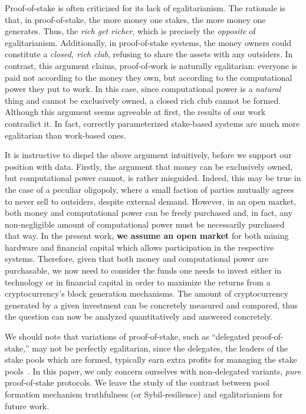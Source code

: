 
Proof-of-stake is often criticized for its lack of egalitarianism. The
rationale is that, in proof-of-stake, the more money one stakes, the more money
one generates. Thus, the \emph{rich get richer}, which is precisely the
\emph{opposite} of egalitarianism. Additionally, in proof-of-stake systems, the
money owners could constitute a \emph{closed, rich club}, refusing to share the
assets with any outsiders.  In contrast, this argument claims, proof-of-work is
naturally egalitarian: everyone is paid not according to the money they own,
but according to the computational power they put to work. In this case, since
computational power is a \emph{natural} thing and cannot be exclusively owned,
a closed rich club cannot be formed.
Although this argument seems agreeable at first, the results of our work contradict it.
In fact, correctly parameterized stake-based systems are much more egalitarian than work-based ones.

It is instructive to dispel the above argument intuitively, before we support
our position with data. Firstly, the argument that money can be exclusively
owned, but computational power cannot, is rather misguided. Indeed, this may be true
in the case of a peculiar oligopoly, where a small faction of parties mutually
agrees to never sell to outsiders, despite external demand. However, in an open
market, both money and computational power can be freely purchased and, in
fact, any non-negligible amount of computational power must be necessarily
purchased that way.
In the present work, \textbf{we assume an open market} for both mining hardware
and financial capital which allows participation in the respective systems.
Therefore, given that both money and computational power
are purchasable, we now need to consider the funds one needs to invest either in
technology or in financial capital in order to maximize the returns from a
cryptocurrency's block generation mechanisms. The amount of cryptocurrency
generated by a given investment can be concretely measured and compared, thus
the question can now be analyzed quantitatively and answered concretely.

We should
note that variations of proof-of-stake, such as ``delegated proof-of-stake,''
may not be perfectly egalitarian, since the delegates, \ie the leaders of
the stake pools which are formed, typically earn extra profits for managing the
stake pools~\cite{bkks2018}. In this paper, we only concern
ourselves with non-delegated variants, \ie \emph{pure} proof-of-stake protocols.
We leave the study of the contrast between pool formation mechanism truthfulness
(or Sybil-resilience) and egalitarianism for future work.
